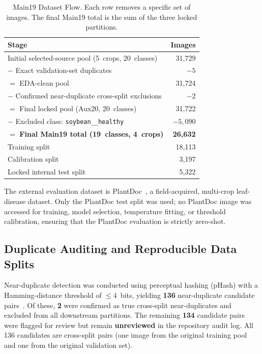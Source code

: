\documentclass[conference]{IEEEtran}
\begin{document}
\begin{table}[!t]
\caption{Main19 Dataset Flow. Each row removes a specific set of
images. The final Main19 total is the sum of the three locked
partitions.}
\label{tab:dataflow}
\centering
\small
\begin{tabular}{lr}
\toprule
\textbf{Stage} & \textbf{Images} \\
\midrule
Initial selected-source pool (5~crops, 20~classes) & 31{,}729 \\
$-$ Exact validation-set duplicates & $-5$ \\
$=$ EDA-clean pool & 31{,}724 \\
$-$ Confirmed near-duplicate cross-split exclusions & $-2$ \\
$=$ Final locked pool (Aux20, 20~classes) & 31{,}722 \\
$-$ Excluded class: \texttt{soybean\_\_healthy} & $-5{,}090$ \\
$=$ \textbf{Final Main19 total (19~classes, 4~crops)} & \textbf{26{,}632} \\
\midrule
\quad Training split & 18{,}113 \\
\quad Calibration split & 3{,}197 \\
\quad Locked internal test split & 5{,}322 \\
\bottomrule
\end{tabular}
\end{table}

The external evaluation dataset is
PlantDoc~\cite{singh2020plantdoc}, a field-acquired, multi-crop
leaf-disease dataset. Only the PlantDoc test split was used; no
PlantDoc image was accessed for training, model selection, temperature
fitting, or threshold calibration, ensuring that the PlantDoc
evaluation is strictly zero-shot.

\subsection{Duplicate Auditing and Reproducible Data Splits}
\label{sec:duplicate}

Near-duplicate detection was conducted using perceptual hashing
(pHash) with a Hamming-distance threshold of $\leq 4$~bits, yielding
\textbf{136} near-duplicate candidate
pairs~\cite{zauner2010implementation}. Of these, \textbf{2} were
confirmed as true cross-split near-duplicates and excluded from
all downstream partitions. The remaining \textbf{134} candidate pairs
were flagged for review but remain \textbf{unreviewed} in the
repository audit log. All 136 candidates are cross-split pairs (one
image from the original training pool and one from the original
validation set).
\end{document}
